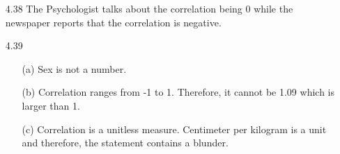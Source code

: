 \documentclass[11pt, a4paper]{article}
\begin{document}
\begin{itemize}
\item[4.38]
The Psychologist talks about the correlation being 0 while
the newspaper reports that the correlation is negative.

\item[]
\item[]

\item[4.39]
\begin{itemize}
\item[(a)]
Sex is not a number.

\item[]

\item[(b)]
Correlation ranges from -1 to 1. Therefore, it cannot be 1.09 which
is larger than 1.

\item[]

\item[(c)]
Correlation is a unitless measure. Centimeter per kilogram is a unit
and therefore, the statement contains a blunder.
\end{itemize}

\end{itemize}
\end{document}
